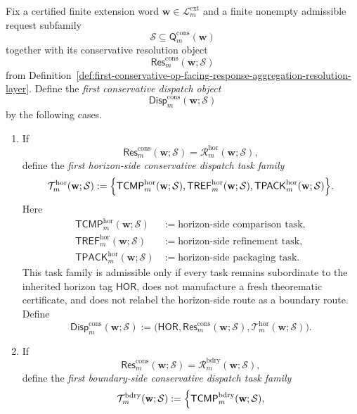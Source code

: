 \begin{definition}
\label{def:first-conservative-resolution-to-task-dispatch-layer}
Fix a certified finite extension word \(\mathbf w\in\mathcal L^{\mathrm{ext}}_{m}\) and a finite nonempty admissible request subfamily
\[
 \mathcal S \subseteq \mathsf{Q}^{\mathrm{cons}}_{m}(\mathbf w)
\]
together with its conservative resolution object
\[
 \mathsf{Res}^{\mathrm{cons}}_{m}(\mathbf w;\mathcal S)
\]
from Definition~\ref{def:first-conservative-op-facing-response-aggregation-resolution-layer}. Define the \emph{first conservative dispatch object}
\[
 \mathsf{Disp}^{\mathrm{cons}}_{m}(\mathbf w;\mathcal S)
\]
by the following cases.
\begin{enumerate}[label=(\roman*)]
 \item If
 \[
 \mathsf{Res}^{\mathrm{cons}}_{m}(\mathbf w;\mathcal S)
 =
 \mathcal R^{\mathrm{hor}}_{m}(\mathbf w;\mathcal S),
 \]
 define the \emph{first horizon-side conservative dispatch task family}
 \[
 \mathcal T^{\mathrm{hor}}_{m}(\mathbf w;\mathcal S)
 :=
 \Bigl\{
 \mathsf{TCMP}^{\mathrm{hor}}_{m}(\mathbf w;\mathcal S),
 \mathsf{TREF}^{\mathrm{hor}}_{m}(\mathbf w;\mathcal S),
 \mathsf{TPACK}^{\mathrm{hor}}_{m}(\mathbf w;\mathcal S)
 \Bigr\}.
 \]
 Here
 \begin{align*}
 \mathsf{TCMP}^{\mathrm{hor}}_{m}(\mathbf w;\mathcal S) &:= \text{horizon-side comparison task},\\
 \mathsf{TREF}^{\mathrm{hor}}_{m}(\mathbf w;\mathcal S) &:= \text{horizon-side refinement task},\\
 \mathsf{TPACK}^{\mathrm{hor}}_{m}(\mathbf w;\mathcal S) &:= \text{horizon-side packaging task}.
 \end{align*}
 This task family is admissible only if every task remains subordinate to the inherited horizon tag \(\mathsf{HOR}\), does not manufacture a fresh theorematic certificate, and does not relabel the horizon-side route as a boundary route. Define
 \[
 \mathsf{Disp}^{\mathrm{cons}}_{m}(\mathbf w;\mathcal S)
 :=
 \bigl(\mathsf{HOR},\mathsf{Res}^{\mathrm{cons}}_{m}(\mathbf w;\mathcal S),\mathcal T^{\mathrm{hor}}_{m}(\mathbf w;\mathcal S)\bigr).
 \]
 \item If
 \[
 \mathsf{Res}^{\mathrm{cons}}_{m}(\mathbf w;\mathcal S)
 =
 \mathcal R^{\mathrm{bdry}}_{m}(\mathbf w;\mathcal S),
 \]
 define the \emph{first boundary-side conservative dispatch task family}
 \[
 \mathcal T^{\mathrm{bdry}}_{m}(\mathbf w;\mathcal S)
 :=
 \Bigl\{
 \mathsf{TCMP}^{\mathrm{bdry}}_{m}(\mathbf w;\mathcal S),
\]
\end{enumerate}
\end{definition}
